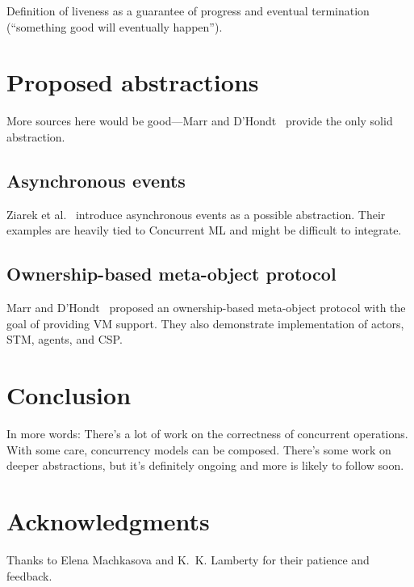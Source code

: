 \documentclass{sig-alternate}
\begin{document}
Definition of liveness as a guarantee of progress and eventual termination (``something good will eventually happen'').

\section{Proposed abstractions}

More sources here would be good---Marr and D'Hondt~\cite{Marr2012} provide the only solid abstraction.

\subsection{Asynchronous events}

Ziarek et al.~\cite{Ziarek2011} introduce asynchronous events as a possible abstraction. Their examples are heavily tied to Concurrent ML and might be difficult to integrate.

\subsection{Ownership-based meta-object protocol}

Marr and D'Hondt~\cite{Marr2012} proposed an ownership-based meta-object protocol with the goal of providing VM support. They also demonstrate implementation of actors, STM, agents, and CSP.

\section{Conclusion}

In more words: There's a lot of work on the correctness of concurrent operations. With some care, concurrency models can be composed. There's some work on deeper abstractions, but it's definitely ongoing and more is likely to follow soon.

\section*{Acknowledgments}

Thanks to Elena Machkasova and K.~K. Lamberty for their patience and feedback.

\printbibliography{}
\end{document}

